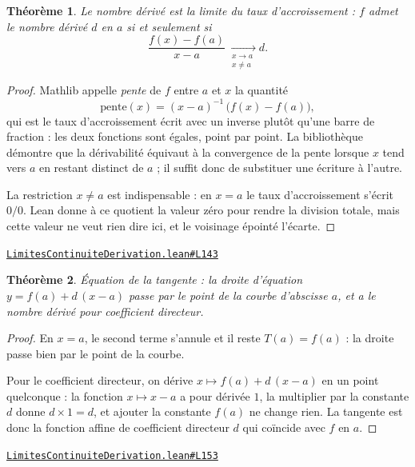 \documentclass[11pt,a4paper]{article}
\theoremstyle{definition}
\theoremstyle{plain}
\newtheorem{theoreme}{Théorème}
\newcommand{\source}[2]{\par\smallskip\noindent\hfill{\footnotesize\href{#1}{\texttt{#2}}}\par\smallskip}
\begin{document}
\begin{theoreme}
Le nombre dérivé est la limite du taux d'accroissement : $f$ admet le nombre dérivé $d$
en $a$ si et seulement si
\[ \frac{f(x) - f(a)}{x - a} \xrightarrow[\substack{x \to a \\ x \ne a}]{} d . \]
\end{theoreme}

\begin{proof}
Mathlib appelle \emph{pente} de $f$ entre $a$ et $x$ la quantité
\[ \mathrm{pente}(x) = (x - a)^{-1}\,\bigl(f(x) - f(a)\bigr) , \]
qui est le taux d'accroissement écrit avec un inverse plutôt qu'une barre de fraction :
les deux fonctions sont égales, point par point. La bibliothèque démontre que la
dérivabilité équivaut à la convergence de la pente lorsque $x$ tend vers $a$ en restant
distinct de $a$ ; il suffit donc de substituer une écriture à l'autre.

\medskip\noindent
La restriction $x \ne a$ est indispensable : en $x = a$ le taux d'accroissement s'écrit
$0/0$. Lean donne à ce quotient la valeur zéro pour rendre la division totale, mais cette
valeur ne veut rien dire ici, et le voisinage épointé l'écarte.
\end{proof}
\source{https://github.com/Commutator-IO/learn-lean/blob/main/cours/02-lycee/04-limites-continuite-derivation/LimitesContinuiteDerivation.lean\#L143}{LimitesContinuiteDerivation.lean\#L143}

\begin{theoreme}
Équation de la tangente : la droite d'équation $y = f(a) + d\,(x - a)$ passe par le point
de la courbe d'abscisse $a$, et a le nombre dérivé pour coefficient directeur.
\end{theoreme}

\begin{proof}
En $x = a$, le second terme s'annule et il reste $T(a) = f(a)$ : la droite passe bien par
le point de la courbe.

Pour le coefficient directeur, on dérive $x \mapsto f(a) + d\,(x - a)$ en un point
quelconque : la fonction $x \mapsto x - a$ a pour dérivée $1$, la multiplier par la
constante $d$ donne $d \times 1 = d$, et ajouter la constante $f(a)$ ne change rien. La
tangente est donc la fonction affine de coefficient directeur $d$ qui coïncide avec $f$ en
$a$.
\end{proof}
\source{https://github.com/Commutator-IO/learn-lean/blob/main/cours/02-lycee/04-limites-continuite-derivation/LimitesContinuiteDerivation.lean\#L153}{LimitesContinuiteDerivation.lean\#L153}
\end{document}
